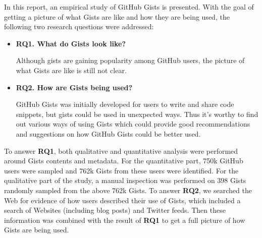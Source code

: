 In this report, an empirical study of GitHub Gists is presented. With the goal of getting a picture of what Gists are like and how they are being used, the following two research questions were addressed:

\begin{itemize}

  \item {\bf RQ1. What do Gists look like?}
  
  Although gists are gaining popularity among GitHub users, the picture of what Gists are like is still not clear. 

  \item {\bf RQ2. How are Gists being used?}
  
  GitHub Gists was initially developed for users to write and share code snippets, but gists could be used in unexpected ways. Thus it's worthy to find out various ways of using Gists which could provide good recommendations and suggestions on how GitHub Gists could be better used.
  
\end{itemize}
To answer {\bf RQ1}, both qualitative and quantitative analysis were performed around Gists contents and metadata. For the quantitative part, 750k GitHub users were sampled and 762k Gists from these users were identified. For the qualitative part of the study, a manual inspection was performed on 398 Gists randomly sampled from the above 762k Gists. To answer {\bf RQ2}, we searched the Web for evidence of how users described their use of Gists, which included a search of Websites (including blog posts) and Twitter feeds. Then these information was combined with the result of {\bf RQ1} to get a full picture of how Gists are being used.